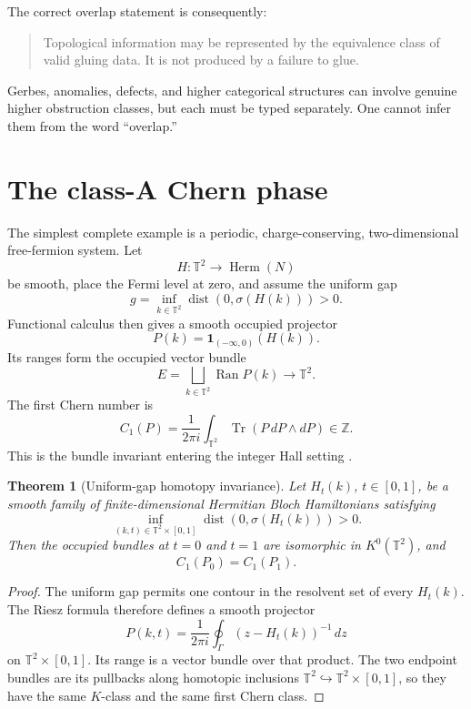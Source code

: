 \documentclass[11pt]{article}
\newtheorem{theorem}{Theorem}[section]
\theoremstyle{definition}
\theoremstyle{remark}
\newcommand{\T}{\mathbb{T}}
\newcommand{\Z}{\mathbb{Z}}
\newcommand{\Tr}{\operatorname{Tr}}
\begin{document}
The correct overlap statement is consequently:
\begin{quote}
Topological information may be represented by the equivalence class of
valid gluing data.  It is not produced by a failure to glue.
\end{quote}
Gerbes, anomalies, defects, and higher categorical structures can involve
genuine higher obstruction classes, but each must be typed separately.  One
cannot infer them from the word ``overlap.''

\section{The class-A Chern phase}
\label{sec:chern}

The simplest complete example is a periodic, charge-conserving,
two-dimensional free-fermion system.  Let
\[
 H:\T^2\longrightarrow \operatorname{Herm}(N)
\]
be smooth, place the Fermi level at zero, and assume the uniform gap
\[
 g=\inf_{k\in\T^2}\operatorname{dist}(0,\sigma(H(k)))>0.
\]
Functional calculus then gives a smooth occupied projector
\[
 P(k)=\mathbf 1_{(-\infty,0)}(H(k)).
\]
Its ranges form the occupied vector bundle
\[
 E=\bigsqcup_{k\in\T^2}\operatorname{Ran}P(k)\longrightarrow\T^2.
\]
The first Chern number is
\begin{equation}
 C_1(P)
 =
 \frac{1}{2\pi i}
 \int_{\T^2}\Tr\!\left(P\,dP\wedge dP\right)
 \in\Z .
\label{eq:chern}
\end{equation}
This is the bundle invariant entering the integer Hall setting
\cite{TKNN1982}.

\begin{theorem}[Uniform-gap homotopy invariance]
\label{thm:homotopy}
Let \(H_t(k)\), \(t\in[0,1]\), be a smooth family of finite-dimensional
Hermitian Bloch Hamiltonians satisfying
\[
 \inf_{(k,t)\in\T^2\times[0,1]}
 \operatorname{dist}(0,\sigma(H_t(k)))>0.
\]
Then the occupied bundles at \(t=0\) and \(t=1\) are isomorphic in
\(K^0(\T^2)\), and
\[
 C_1(P_0)=C_1(P_1).
\]
\end{theorem}

\begin{proof}
The uniform gap permits one contour in the resolvent set of every
\(H_t(k)\).  The Riesz formula therefore defines a smooth projector
\[
 P(k,t)=\frac{1}{2\pi i}\oint_\Gamma
          (z-H_t(k))^{-1}\,dz
\]
on \(\T^2\times[0,1]\).  Its range is a vector bundle over that product.
The two endpoint bundles are its pullbacks along homotopic inclusions
\(\T^2\hookrightarrow\T^2\times[0,1]\), so they have the same \(K\)-class
and the same first Chern class.
\end{proof}
\end{document}
